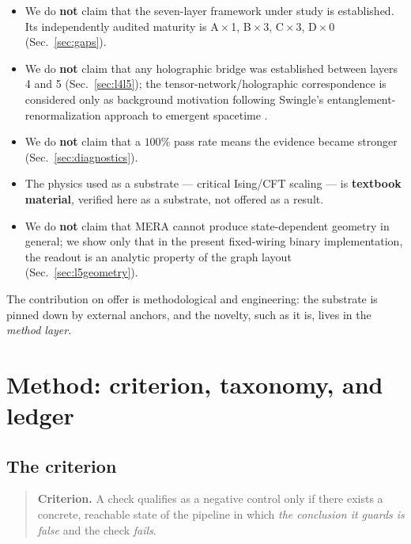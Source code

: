 \documentclass[11pt,a4paper]{article}
\begin{document}
\begin{itemize}[leftmargin=1.4em,itemsep=2pt]
  \item We do \textbf{not} claim that the seven-layer framework under study is
        established. Its independently audited maturity is A\,$\times$\,1,
        B\,$\times$\,3, C\,$\times$\,3, D\,$\times$\,0 (Sec.~\ref{sec:gaps}).
  \item We do \textbf{not} claim that any holographic bridge was established
        between layers 4 and 5 (Sec.~\ref{sec:l4l5}); the tensor-network/holographic
        correspondence is considered only as background motivation following
        Swingle's entanglement-renormalization approach to emergent spacetime
        \cite{Swingle2012}.
  \item We do \textbf{not} claim that a $100\%$ pass rate means the evidence
        became stronger (Sec.~\ref{sec:diagnostics}).
  \item The physics used as a substrate --- critical Ising/CFT scaling --- is
        \textbf{textbook material}, verified here as a substrate, not offered as a
        result.
  \item We do \textbf{not} claim that MERA cannot produce state-dependent geometry
        in general; we show only that in the present fixed-wiring binary
        implementation, the readout is an analytic property of the graph layout
        (Sec.~\ref{sec:l5geometry}).
\end{itemize}

The contribution on offer is methodological and engineering: the substrate is
pinned down by external anchors, and the novelty, such as it is, lives in the
\emph{method layer}.

\section{Method: criterion, taxonomy, and ledger}
\label{sec:method}

\subsection{The criterion}
\label{sec:criterion}

\begin{quote}
\textbf{Criterion.} A check qualifies as a negative control only if there exists a
concrete, reachable state of the pipeline in which \emph{the conclusion it guards
is false} and the check \emph{fails}.
\end{quote}
\end{document}
